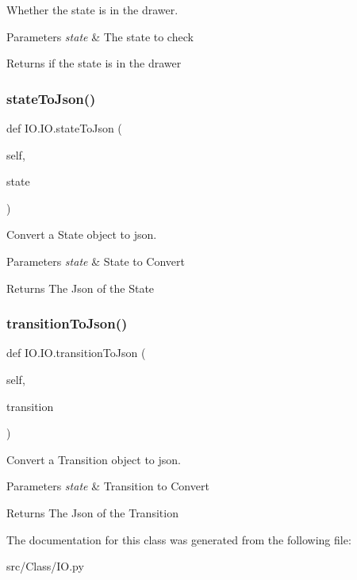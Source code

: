 Whether the state is in the drawer. 


\begin{DoxyParams}{Parameters}
{\em state} & The state to check \\
\hline
\end{DoxyParams}
\begin{DoxyReturn}{Returns}
if the state is in the drawer 
\end{DoxyReturn}
\mbox{\label{classIO_1_1IO_a69ce4e417f3e5d3be96be4915bb59b9a}} 
\subsubsection{\texorpdfstring{stateToJson()}{stateToJson()}}
{\footnotesize\ttfamily def I\+O.\+I\+O.\+state\+To\+Json (\begin{DoxyParamCaption}\item[{}]{self,  }\item[{}]{state }\end{DoxyParamCaption})}



Convert a State object to json. 


\begin{DoxyParams}{Parameters}
{\em state} & State to Convert \\
\hline
\end{DoxyParams}
\begin{DoxyReturn}{Returns}
The Json of the State 
\end{DoxyReturn}
\mbox{\label{classIO_1_1IO_a76a03d86d935add42da0a49f6ff5c77f}} 
\subsubsection{\texorpdfstring{transitionToJson()}{transitionToJson()}}
{\footnotesize\ttfamily def I\+O.\+I\+O.\+transition\+To\+Json (\begin{DoxyParamCaption}\item[{}]{self,  }\item[{}]{transition }\end{DoxyParamCaption})}



Convert a Transition object to json. 


\begin{DoxyParams}{Parameters}
{\em state} & Transition to Convert \\
\hline
\end{DoxyParams}
\begin{DoxyReturn}{Returns}
The Json of the Transition 
\end{DoxyReturn}


The documentation for this class was generated from the following file\+:\begin{DoxyCompactItemize}
\item 
src/\+Class/I\+O.\+py\end{DoxyCompactItemize}
